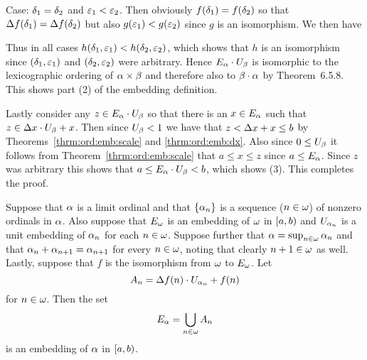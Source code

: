 {{    Case: $\delta_1 = \delta_2$ and $\varepsilon_1 < \varepsilon_2$.
    Then obviously $f(\delta_1) = f(\delta_2)$ so that $\Delta f(\delta_1) = \Delta f(\delta_2)$ but also $g(\varepsilon_1) < g(\varepsilon_2)$ since $g$ is an isomorphism.
    We then have

    Thus in all cases $h(\delta_1, \varepsilon_1) < h(\delta_2, \varepsilon_2)$, which shows that $h$ is an isomorphism since $(\delta_1, \varepsilon_1)$ and $(\delta_2, \varepsilon_2)$ were arbitrary.
    Hence $E_\alpha \cdot U_\beta$ is isomorphic to the lexicographic ordering of $\alpha \times \beta$ and therefore also to $\beta \cdot \alpha$ by Theorem~6.5.8.
    This shows part (2) of the embedding definition.

    Lastly consider any $z \in E_\alpha \cdot U_\beta$ so that there is an $x \in E_\alpha$ such that $z \in \Delta x \cdot U_\beta + x$.
    Then since $U_\beta < 1$ we have that $z < \Delta x + x \leq b$ by Theorems~\ref{thrm:ord:emb:scale} and \ref{thrm:ord:emb:dx}.
    Also since $0 \leq U_\beta$ it follows from Theorem~\ref{thrm:ord:emb:scale} that $a \leq x \leq z$ since $a \leq E_\alpha$.
    Since $z$ was arbitrary this shows that $a \leq E_\alpha \cdot U_\beta < b$, which shows (3).
    This completes the proof.
  }

  \begin{thrm}\label{thrm:ord:emb:sup}
    Suppose that $\alpha$ is a limit ordinal and that $\left\{ \alpha_n \right\}$ is a sequence ($n \in \omega$) of nonzero ordinals in $\alpha$.
    Also suppose that $E_\omega$ is an embedding of $\omega$ in $[a,b)$ and $U_{\alpha_n}$ is a unit embedding of $\alpha_n$ for each $n \in \omega$.
    Suppose further that $\alpha = \sup_{n \in \omega} \alpha_n$ and that $\alpha_n + \alpha_{n+1} = \alpha_{n+1}$ for every $n \in \omega$, noting that clearly $n+1 \in \omega$ as well.
    Lastly, suppose that $f$ is the isomorphism from $\omega$ to $E_\omega$.
    Let
    $$
      A_n = \Delta f(n) \cdot U_{\alpha_n} + f(n)
    $$
    for $n \in \omega$.
    Then the set
    $$
      E_\alpha = \bigcup_{n \in \omega} A_n
    $$
    is an embedding of $\alpha$ in $[a,b)$.
  \end{thrm}
  }
